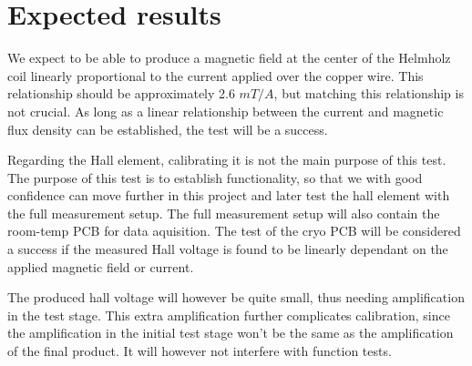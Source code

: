 \documentclass[10pt, a4paper]{article}
\begin{document}
\section{Expected results}
We expect to be able to produce a magnetic field at the center of the Helmholz coil linearly proportional to the current applied over the copper wire.
This relationship should be approximately 2.6 $\si{mT/A}$, but matching this relationship is not crucial.
As long as a linear relationship between the current and magnetic flux density can be established, the test will be a success.

Regarding the Hall element, calibrating it is not the main purpose of this test.
The purpose of this test is to establish functionality, so that we with good confidence can move further in this project and later test the hall element with the full measurement setup.
The full measurement setup will also contain the room-temp PCB for data aquisition.
The test of the cryo PCB will be considered a success if the measured Hall voltage is found to be linearly dependant on the applied magnetic field or current.

The produced hall voltage will however be quite small, thus needing amplification in the test stage.
This extra amplification further complicates calibration, since the amplification in the initial test stage won't be the same as the amplification of the final product.
It will however not interfere with function tests.
\end{document}
